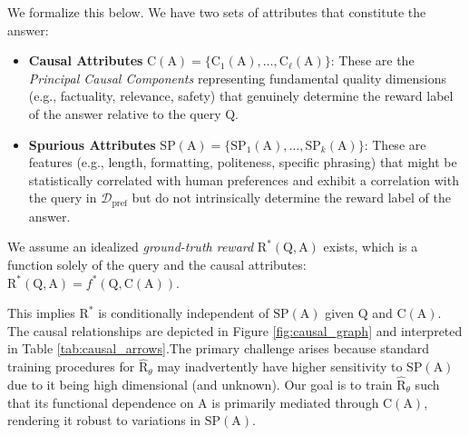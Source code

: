 We formalize this below. We have two sets of attributes that constitute the answer:
\begin{itemize}[itemsep=0pt,left=0pt]
    \item \textbf{Causal Attributes} $\mathrm{C}(\mathrm{A}) = \{\mathrm{C}_1(\mathrm{A}), \dots, \mathrm{C}_\ell(\mathrm{A})\}$: These are the \textit{Principal Causal Components} representing fundamental quality dimensions (e.g., factuality, relevance, safety) that genuinely determine the reward label of the answer relative to the query $\mathrm{Q}$.
    \item \textbf{Spurious Attributes} $\mathrm{SP}(\mathrm{A}) = \{\mathrm{SP}_1(\mathrm{A}), \dots, \mathrm{SP}_k(\mathrm{A})\}$: These are features (e.g., length, formatting, politeness, specific phrasing) that might be statistically correlated with human preferences and exhibit a correlation with the query in $\mathcal{D}_{\mathrm{pref}}$ but do not intrinsically determine the reward label of the answer.
\end{itemize}
We assume an idealized \textit{ground-truth reward} $\mathrm{R}^*(\mathrm{Q}, \mathrm{A})$ exists, which is a function solely of the query and the causal attributes: $\mathrm{R}^*(\mathrm{Q}, \mathrm{A}) = f^*(\mathrm{Q}, \mathrm{C}(\mathrm{A}))$. 

This implies $\mathrm{R}^*$ is conditionally independent of $\mathrm{SP}(\mathrm{A})$ given $\mathrm{Q}$ and $\mathrm{C}(\mathrm{A})$. The causal relationships are depicted in Figure \ref{fig:causal_graph} and interpreted in Table \ref{tab:causal_arrows}.The primary challenge arises because standard training procedures for $\hat{\mathrm{R}}_\theta$ may inadvertently have higher sensitivity to $\mathrm{SP}(\mathrm{A})$ due to it being high dimensional (and unknown). Our goal is to train $\hat{\mathrm{R}}_\theta$ such that its functional dependence on $\mathrm{A}$ is primarily mediated through $\mathrm{C}(\mathrm{A})$, rendering it robust to variations in $\mathrm{SP}(\mathrm{A})$.



